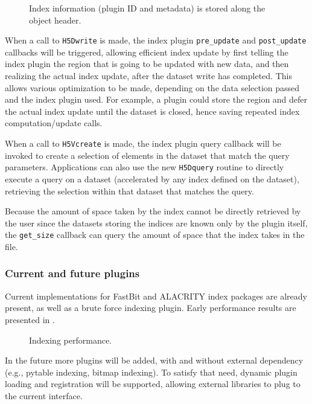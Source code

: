 \documentclass[letterpaper,hyper]{THG_RFC}
\begin{document}
\begin{figure}

\caption{Index information (plugin ID and metadata) is stored along the object header.}
\label{fig:hdf5_index}
\end{figure}

When a call to \texttt{H5Dwrite} is made, the index plugin \texttt{pre\_update} and
\texttt{post\_update} callbacks will be triggered, allowing efficient index
update by first telling the index plugin the region that is going to be updated
with new data, and then realizing the actual index update, after the dataset
write has completed. This allows various optimization to be made, depending on
the data selection passed and the index plugin used. For example, a plugin could
store the region and defer the actual index update until the dataset is closed,
hence saving repeated index computation/update calls.

When a call to \texttt{H5Vcreate} is made, the index plugin query callback will be
invoked to create a selection of elements in the dataset that match the query
parameters. Applications can also use the new \texttt{H5Dquery} routine to directly
execute a query on a dataset (accelerated by any index defined on the dataset),
retrieving the selection within that dataset that matches the query.

Because the amount of space taken by the index cannot be directly retrieved by
the user since the datasets storing the indices are known only by the plugin
itself, the \texttt{get\_size} callback can query the amount of space that
the index takes in the file.


\subsubsection{Current and future plugins}

Current implementations for FastBit and ALACRITY index packages are already
present, as well as a brute force indexing plugin. Early performance results
are presented in .

\begin{figure}

\caption{Indexing performance.}
\label{fig:indexing_perf}
\end{figure}

In the future more plugins
will be added, with and without external dependency (e.g., pytable indexing,
bitmap indexing).
To satisfy that need, dynamic plugin loading and registration will be supported,
allowing external libraries to plug to the current interface.
\end{document}
